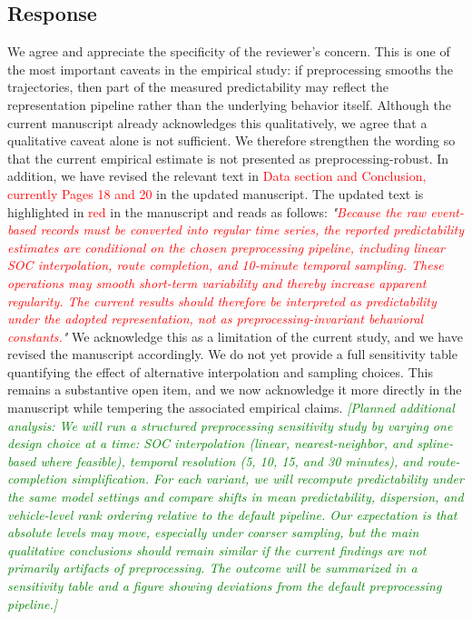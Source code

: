 \documentclass{NSF}
\begin{document}
\subsection{Response}
We agree and appreciate the specificity of the reviewer's concern. This is one of the most important caveats in the empirical study: if preprocessing smooths the trajectories, then part of the measured predictability may reflect the representation pipeline rather than the underlying behavior itself. Although the current manuscript already acknowledges this qualitatively, we agree that a qualitative caveat alone is not sufficient. We therefore strengthen the wording so that the current empirical estimate is not presented as preprocessing-robust.
\noindent In addition, we have revised the relevant text in \textcolor{red}{Data section and Conclusion, currently Pages 18 and 20} in the updated manuscript. The updated text is highlighted in \textcolor{red}{red} in the manuscript and reads as follows:
\vskip 0.1cm
\noindent \textit{"\textcolor{red}{Because the raw event-based records must be converted into regular time series, the reported predictability estimates are conditional on the chosen preprocessing pipeline, including linear SOC interpolation, route completion, and 10-minute temporal sampling. These operations may smooth short-term variability and thereby increase apparent regularity. The current results should therefore be interpreted as predictability under the adopted representation, not as preprocessing-invariant behavioral constants.}"}
\vskip 0.05in
\noindent We acknowledge this as a limitation of the current study, and we have revised the manuscript accordingly. We do not yet provide a full sensitivity table quantifying the effect of alternative interpolation and sampling choices. This remains a substantive open item, and we now acknowledge it more directly in the manuscript while tempering the associated empirical claims.
\vskip 0.05in
\noindent\textcolor{green}{\textit{[Planned additional analysis: We will run a structured preprocessing sensitivity study by varying one design choice at a time: SOC interpolation (linear, nearest-neighbor, and spline-based where feasible), temporal resolution (5, 10, 15, and 30 minutes), and route-completion simplification. For each variant, we will recompute predictability under the same model settings and compare shifts in mean predictability, dispersion, and vehicle-level rank ordering relative to the default pipeline. Our expectation is that absolute levels may move, especially under coarser sampling, but the main qualitative conclusions should remain similar if the current findings are not primarily artifacts of preprocessing. The outcome will be summarized in a sensitivity table and a figure showing deviations from the default preprocessing pipeline.]}}
\end{document}
